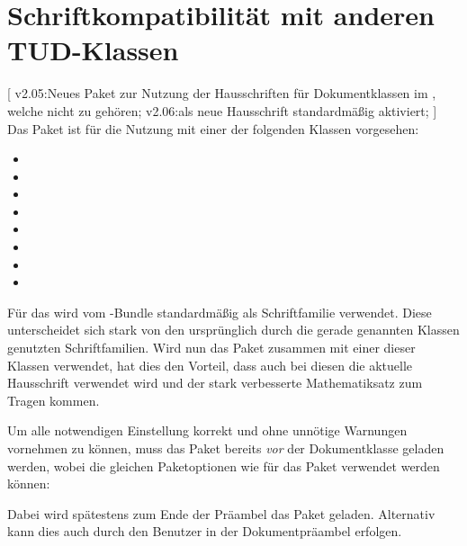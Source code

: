 \section[%
  Das Paket \Package{fix-tudscrfonts} -- Schriftkompatibilität%
]{%
  Schriftkompatibilität mit anderen TUD-Klassen%
}
%
\begin{DeclareEntity}{}[%
  v2.05:Neues Paket zur Nutzung der Hausschriften für Dokumentklassen im 
  \TUDCD, welche nicht zu \TUDScript gehören;%
  v2.06:\OpenSans als neue Hausschrift standardmäßig aktiviert;%
]
%
Das Paket  ist für die Nutzung mit einer der folgenden 
Klassen vorgesehen:
\begin{itemize}
\item {}
\item {}
\item {}
\item {}
\item {}
\item {}
\item {}
\item {}
\end{itemize}
%
Für das \TUDCD wird vom \TUDScript-Bundle standardmäßig \OpenSans als 
Schriftfamilie verwendet. Diese unterscheidet sich stark von den ursprünglich 
durch die gerade genannten Klassen genutzten Schriftfamilien. Wird nun das 
Paket  zusammen mit einer dieser Klassen verwendet, 
hat dies den Vorteil, dass auch bei diesen die aktuelle Hausschrift verwendet 
wird und der stark verbesserte Mathematiksatz zum Tragen kommen.
%

Um alle notwendigen Einstellung korrekt und ohne unnötige Warnungen vornehmen 
zu können, muss das Paket  bereits \emph{vor} der 
Dokumentklasse geladen werden, wobei die gleichen Paketoptionen wie für das 
Paket  verwendet werden können:
%
%
Dabei wird spätestens zum Ende der Präambel das Paket  
geladen. Alternativ kann dies auch durch den Benutzer in der Dokumentpräambel 
erfolgen.
\end{DeclareEntity}



